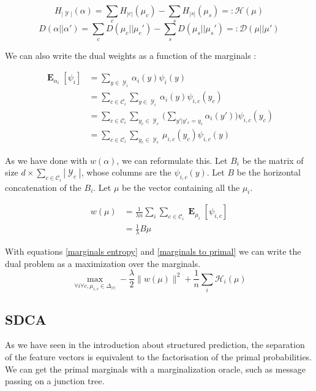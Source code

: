\documentclass{article}
\DeclareMathOperator{\1}{\mathbb{1}}
\DeclareMathOperator{\E}{\mathbf{E}}
\DeclareMathOperator{\Y}{\mathcal{Y}}
\begin{document}
\begin{equation}
	H_{|\Y|} (\alpha) = \sum_c H_{|c|}(\mu_c) - \sum_s H_{|s|}(\mu_s) =: \mathcal H (\mu) 
	\label{marginals entropy}
\end{equation}
\begin{equation}
	D(\alpha||\alpha') = \sum_c D(\mu_c||\mu_c') - \sum_s D(\mu_s||\mu_s') =: \mathcal D (\mu||\mu')
\end{equation}

We can also write the dual weights as a function of the marginals :

\begin{align*}
	   \E_{\alpha_i}[\psi_i]
   & = \sum_{y \in \Y_i} \alpha_i(y) \psi_i(y)  \\
   &  = \sum_{c \in \mathcal C_i} \sum_{y \in \Y_i}  \alpha_i(y)  \psi_{i, c}(y_c)  \\
   & = \sum_{c \in \mathcal C_i}\sum_{y_c \in  \Y_c} \bigg ( \sum_{y'| y'_c = y_c } \alpha_i(y') \bigg ) \psi_{i, c}(y_c) \\
   & = \sum_{c \in \mathcal C_i}\sum_{y_c \in \Y_c} \mu_{i, c}(y_c)  \psi_{i, c}(y)
\end{align*}

As we have done with $w(\alpha)$, we can reformulate this.
Let  $B_i$ be the matrix of size $d \times  \sum_{c \in \mathcal C_i} |\Y_c|$, whose columns are the $\psi_{i, c}(y)$.
Let $B$ be the horizontal concatenation of the $B_i$.
Let $\mu$ be the vector containing all the $\mu_i$.

\begin{align}
	w (\mu)
	& =\frac{1}{\lambda n} \sum_i \sum_{c \in \mathcal C_i} \E_{\mu_i}[\psi_{i, c}] \\
	& = \frac{1}{\lambda} B\mu \label{marginals to primal}
\end{align}

With equations \ref{marginals entropy} and \ref{marginals to primal} we can write the dual problem as a maximization over the marginals.
\begin{equation}
	\max_{\forall i \forall c, \mu_{i, c} \in \Delta_{|c|} } - \frac{\lambda}{2} \|w(\mu)\|^2 + \frac{1}{n} \sum_i \mathcal H _ i(\mu)
\end{equation}

\subsection{SDCA}

As we have seen in the introduction about structured prediction, the separation of the feature vectors is equivalent to the factorisation of the primal probabilities.
We can get the primal marginals with a marginalization oracle, such as message passing on a junction tree. 
\end{document}
